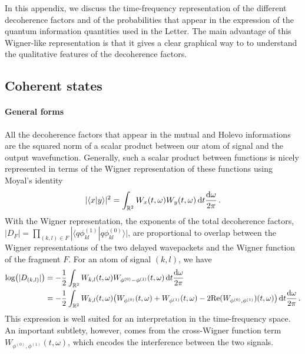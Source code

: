 In this appendix, we discuss the time-frequency
representation of the different decoherence factors and of the
probabilities that appear in the expression of the 
quantum information quantities used in the Letter. The main 
advantage of this Wigner-like representation is that it gives a clear graphical
way to to understand the qualitative features of the decoherence factors.

\subsection{Coherent states}

\paragraph{General forms}

All the decoherence factors that appear in the mutual and Holevo informations
are the squared norm of a scalar product between our atom of signal and 
the output wavefunction. Generally, such a scalar product between functions
is nicely represented in terms of the Wigner representation of these functions
using Moyal's identity
%
\begin{align}
|\langle x | y \rangle|^2 = 
	\int_{\mathbb{R}^2} 
		W_x(t,\omega) W_y(t,\omega)
	\, \mathrm{d} t \frac{\mathrm{d}\omega}{2\pi}
\,.
\end{align}
With the Wigner representation, the exponents of the total decoherence 
factors, $|D_F|= \prod_{(k,l) \in F}|\langle q\phi^{(1)}_{kl}
| q\phi^{(0)}_{kl}\rangle|$, are proportional to 
overlap between the Wigner representations of the two delayed 
wavepackets and the Wigner function of the fragment $F$. For an
atom of signal $(k,l)$, we have
%
\begin{align}
\log(|D_{(k,l)}|) &= -\frac{1}{2}
	\int_{\mathbb{R}^2} 
		W_{k,l}(t,\omega)W_{\phi^{(0)}-\phi^{(1)}}(t,\omega)
	\, \mathrm{d} t \frac{\mathrm{d}\omega}{2\pi}
\\
&=-\frac{1}{2} 
	\int_{\mathbb{R}^2} 
		W_{k,l}(t,\omega)
		\big(W_{\phi^{(0)}}(t,\omega) 
		+ W_{\phi^{(1)}}(t,\omega) 
		-2\text{Re}(W_{\phi^{(0)},\phi^{(1)}})(t,\omega)
		\big)
	\, \mathrm{d} t \frac{\mathrm{d}\omega}{2\pi} \,.
\end{align}
This expression is well suited for an interpretation in the time-frequency
space. An important subtlety, however, comes from the cross-Wigner function
term~$W_{\phi^{(0)},\phi^{(1)}}(t,\omega)$, which encodes the interference
between the two signals.

